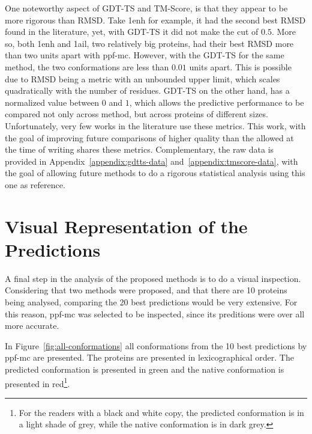 One noteworthy aspect of GDT-TS and TM-Score, is that they appear to be more
rigorous than RMSD. Take 1enh for example, it had the second best RMSD found
in the literature, yet, with GDT-TS it did not make the cut of $0.5$. More so,
both 1enh and 1ail, two relatively big proteins, had their best RMSD more
than two units apart with ppf-mc. However, with the GDT-TS for the same
method, the two conformations are less than $0.01$ units apart. This is possible
due to RMSD being a metric with an unbounded upper limit, which scales
quadratically with the number of residues. GDT-TS on the other hand, has a
normalized value between $0$ and $1$, which allows the predictive performance
to be compared not only across method, but across proteins of different sizes.
Unfortunately, very few works in the literature use these metrics. This work,
with the goal of improving future comparisons of higher quality than the allowed
at the time of writing shares these metrics. Complementary, the raw data is
provided in Appendix~\ref{appendix:gdtts-data} and~\ref{appendix:tmscore-data},
with the goal of allowing future methods to do a rigorous statistical analysis
using this one as reference.

\section{Visual Representation of the Predictions}
\label{sec:visual-analysis}

A final step in the analysis of the proposed methods is to do a visual
inspection. Considering that two methods were proposed, and that there are 10
proteins being analysed, comparing the 20 best predictions would be very
extensive. For this reason, ppf-mc was selected to be inspected, since
its preditions were over all more accurate.



In Figure~\ref{fig:all-conformations} all conformations from the 10 best
predictions by ppf-mc are presented. The proteins are presented in
lexicographical order. The predicted conformation is presented in green and the
native conformation is presented in red\footnote{For the readers with a black
and white copy, the predicted conformation is in a light shade of grey, while
the native conformation is in dark grey.}.

